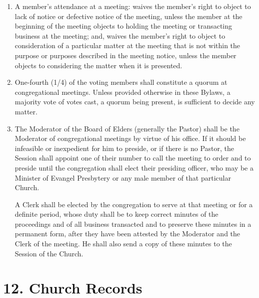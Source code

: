 \documentclass[
]{book}
\begin{document}
\begin{enumerate}
\item
  A member's attendance at a meeting: waives the member's right to object to lack of notice or defective notice of the meeting, unless the member at the beginning of the meeting objects to holding the meeting or transacting business at the meeting; and, waives the member's right to object to consideration of a particular matter at the meeting that is not within the purpose or purposes described in the meeting notice, unless the member objects to considering the matter when it is presented.
\item
  One-fourth (1/4) of the voting members shall constitute a quorum at congregational meetings. Unless provided otherwise in these Bylaws, a majority vote of votes cast, a quorum being present, is sufficient to decide any matter.
\item
  The Moderator of the Board of Elders (generally the Pastor) shall be the Moderator of congregational meetings by virtue of his office. If it should be infeasible or inexpedient for him to preside, or if there is no Pastor, the Session shall appoint one of their number to call the meeting to order and to preside until the congregation shall elect their presiding officer, who may be a Minister of Evangel Presbytery or any male member of that particular Church.

  A Clerk shall be elected by the congregation to serve at that meeting or for a definite period, whose duty shall be to keep correct minutes of the proceedings and of all business transacted and to preserve these minutes in a permanent form, after they have been attested by the Moderator and the Clerk of the meeting. He shall also send a copy of these minutes to the Session of the Church.
\end{enumerate}

\hypertarget{church-records}{%
\section{12. Church Records}\label{church-records}}
\end{document}

